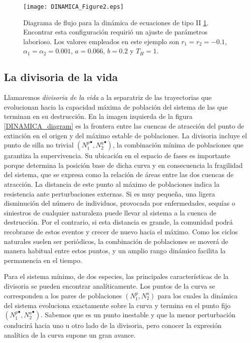 \begin{figure}
\centering
\texttt{[image: DINAMICA\_Figure2.eps]}
\caption {Diagrama de flujo para la dinámica de ecuaciones de tipo II \ref{DINAMICA_typeII}. Encontrar esta configuración requirió un ajuste de parámetros laborioso. Los valores empleados en este ejemplo son $r_1 = r_2 = -0.1$, $\alpha_1 = \alpha_2 = 0.001$, $a = 0.066$, $b = 0.2$ y $T_H = 1$.}
\label{DINAMICA_typeII}
\end{figure}

\subsection{La divisoria de la vida}
\label{watershed}

Llamaremos \textit{divisoria de la vida} a la separatriz de las trayectorias que evolucionan hacia la capacidad máxima de población del sistema de las que terminan en su destrucción. En la imagen izquierda de la figura \ref{DINAMICA_diagram} es la frontera entre las cuencas de atracción del punto de extinción en el origen y del máximo estable de poblaciones. La divisoria incluye el punto de silla no trivial $({N_1^p}^\bullet,{N_2^a}^\bullet)$, la combinación mínima de poblaciones que garantiza la supervivencia. Su ubicación en el espacio de fases es importante porque determina la posición base de dicha curva y en consecuencia la fragilidad del sistema, que se expresa como la relación de áreas entre las dos cuencas de atracción. La distancia de este punto al máximo de poblaciones indica la resistencia ante perturbaciones externas. Si es muy pequeña, una ligera disminución del número de individuos, provocada por enfermedades, sequías o siniestros de cualquier naturaleza puede llevar al sistema a la cuenca de destrucción. Por el contrario, si esta distancia es grande, la comunidad podrá recobrarse de estos eventos y crecer de nuevo hacia el máximo. Como los ciclos naturales suelen ser periódicos, la combinación de poblaciones se moverá de manera habitual entre estos puntos, y un amplio rango dinámico facilita la permanencia en el tiempo. 

Para el sistema mínimo, de dos especies, las principales características de la divisoria se pueden encontrar analíticamente. Los puntos de la curva se corresponden a los pares de poblaciones $({N_1^p},{N_2^a})$ para los cuales la dinámica del sistema evoluciona exactamente sobre la curva y termina en el punto fijo $({N_1^p}^\bullet,{N_2^a}^\bullet)$. Sabemos que es un punto inestable y que la menor perturbación conducirá hacia uno u otro lado de la divisoria, pero conocer la expresión analítica de la curva supone un gran avance.  

